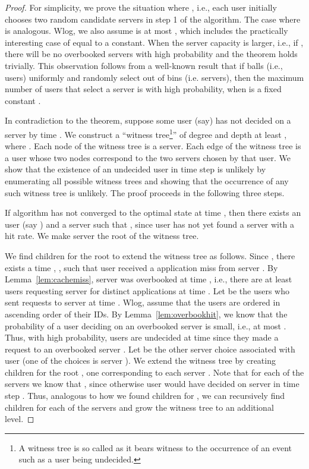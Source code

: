 \documentclass[conference]{IEEEtran}
\newcommand{\comment}[1]{}
\begin{document}
\begin{proof}
For simplicity, we prove the situation where , i.e., each user initially chooses two random candidate servers in step 1 of the algorithm. The case where  is analogous. 
\comment{Further we will assume that a user  requesting application from an overbooked server   at time ,  , has ,  as the probability that this assumption is violated at most  as per Lemma~\ref{lem:overbookhit}.}  Wlog, we also assume   is at most , which includes the practically interesting case of   equal to a constant.  When the server capacity is larger, i.e., if  ,  there will be no overbooked servers with high probability and the theorem holds trivially. This observation follows from a well-known result that if  balls (i.e., users)  uniformly and randomly select   out of  bins (i.e. servers), then the maximum number of users that select a server is  with high probability, when   is a fixed constant \cite{raab1998balls}. 

In contradiction to the theorem, suppose some user  (say) has not decided on a server  by time . We construct a ``witness tree\footnote{A witness tree is so called as it bears witness to the occurrence of an event such as  a user being undecided.}''  of degree  and depth at least , where  . Each node of the witness tree is a server. Each edge of the witness tree is a user whose two nodes correspond to the two servers chosen by that user.  We show that the existence of an undecided user in time step  is unlikely by enumerating all possible witness trees and showing that the occurrence of any such  witness tree is unlikely.  The proof proceeds in the following three steps.

  If algorithm  has not converged to the optimal state at time , then there  exists an user (say )  and a server  such that , since user  has not yet found a server with a  hit rate. We make server  the root of the witness tree.


We find children for the root  to extend the witness tree as follows. Since , there exists a time , , such that user   received a application miss from server .  By Lemma~\ref{lem:cachemiss},  server  was overbooked at time , i.e., there are at least   users requesting server  for  distinct applications at time . Let  be the users who sent requests to server  at time . Wlog, assume that the users  are ordered in 
ascending order of their IDs.  By Lemma~\ref{lem:overbookhit}, we know that the probability of a user deciding on an overbooked server is small, i.e., at most . Thus, with high probability, users   are undecided at time  since they made a request to an overbooked server . Let  be the other server choice associated with user  (one of the choices is server ).  We extend the witness tree by creating  children for the root , one corresponding to each server .  Note that for each of the servers  we know that , since otherwise user  would have decided on server  in time step . Thus, analogous to how we found children for , we can recursively find  children for each of the servers  and grow the witness tree to an additional level.   


\end{proof}
\end{document}
